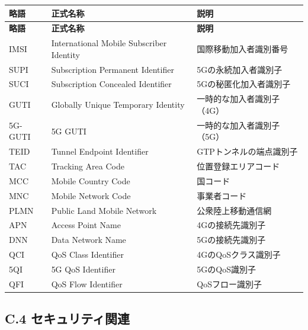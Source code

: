 \begin{longtable}{|p{1.8cm}|p{4.5cm}|p{6.5cm}|}
\hline
\textbf{略語} & \textbf{正式名称} & \textbf{説明} \\
\hline
\endfirsthead
\hline
\textbf{略語} & \textbf{正式名称} & \textbf{説明} \\
\hline
\endhead
\hline
\endfoot
IMSI & International Mobile Subscriber Identity & 国際移動加入者識別番号 \\
\hline
SUPI & Subscription Permanent Identifier & 5Gの永続加入者識別子 \\
\hline
SUCI & Subscription Concealed Identifier & 5Gの秘匿化加入者識別子 \\
\hline
GUTI & Globally Unique Temporary Identity & 一時的な加入者識別子（4G） \\
\hline
5G-GUTI & 5G GUTI & 一時的な加入者識別子（5G） \\
\hline
TEID & Tunnel Endpoint Identifier & GTPトンネルの端点識別子 \\
\hline
TAC & Tracking Area Code & 位置登録エリアコード \\
\hline
MCC & Mobile Country Code & 国コード \\
\hline
MNC & Mobile Network Code & 事業者コード \\
\hline
PLMN & Public Land Mobile Network & 公衆陸上移動通信網 \\
\hline
APN & Access Point Name & 4Gの接続先識別子 \\
\hline
DNN & Data Network Name & 5Gの接続先識別子 \\
\hline
QCI & QoS Class Identifier & 4GのQoSクラス識別子 \\
\hline
5QI & 5G QoS Identifier & 5GのQoS識別子 \\
\hline
QFI & QoS Flow Identifier & QoSフロー識別子 \\
\hline
\end{longtable}

\subsection*{C.4 セキュリティ関連}

